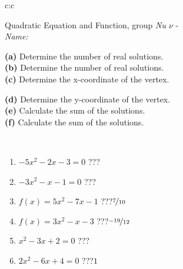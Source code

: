 \documentclass[10pt]{report}
\begin{document}
\begin{tabular}{c:c}
\begin{minipage}[c][104.5mm][t]{0.5\linewidth}
\begin{center}
\vspace{7mm}
{\huge {\LARGE Quadratic Equation and Function}, group \textit{Nu $\nu$} -}\\[5mm]
\textit{Name:}\phantom{xxxxxxxxxxxxxxxxxxxxxxxxxxxxxxxxxxxxxxxxxxxxxxxxxxxxxxxxxxxxxxxxx}\\[5mm]
\begin{minipage}{0.95\linewidth}
\begin{center}
{\small \begin{minipage}{0.5\textwidth}
\textbf{(a)} Determine the number of real solutions. \\[1mm]
\textbf{(b)} Determine the number of real solutions. \\[1mm]
\textbf{(c)} Determine the x-coordinate of the vertex.
\end{minipage} \begin{minipage}{0.49\textwidth}
\textbf{(d)} Determine the y-coordinate of the vertex. \\[1mm]
\textbf{(e)} Calculate the sum of the solutions. \\[1mm]
\textbf{(f)} Calculate the sum of the solutions.
\end{minipage}
}
\end{center}
\end{minipage}
\\[4mm]
\begin{minipage}{0.79\linewidth}
\begin{center}
\begin{varwidth}{\linewidth}
\begin{enumerate}
\Large
\item $-5x^2-2x-3=0$\quad \dotfill\; ???\;\dotfill {}
\item $-3x^2-x-1=0$\quad \dotfill\; ???\;\dotfill {}
\item $f(x)=5x^2-7x-1$\quad \dotfill\; ???\;\dotfill \quad $\nicefrac{7}{10}$
\item $f(x)=3x^2-x-3$\quad \dotfill\; ???\;\dotfill \quad $\nicefrac{-19}{12}$
\item $x^2-3x+2=0$\quad \dotfill\; ???\;\dotfill {}
\item $2x^2-6x+4=0$\quad \dotfill\; ???\;\dotfill \quad $1$
\end{enumerate}
\end{varwidth}
\end{center}

\end{minipage}
\end{center}
\end{minipage}
\end{tabular}
\end{document}

